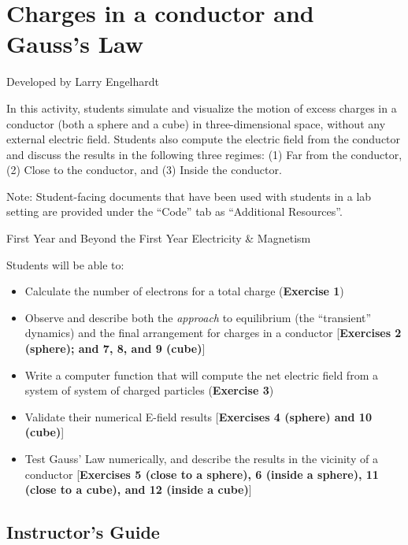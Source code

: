 \documentclass[]{article}
\date{}
\providecommand{\tightlist}{%
  \setlength{\itemsep}{0pt}\setlength{\parskip}{0pt}}
\begin{document}
\section{Charges in a conductor and Gauss's
Law}\label{charges-in-a-conductor-and-gausss-law}

Developed by Larry Engelhardt

In this activity, students simulate and visualize the motion of excess
charges in a conductor (both a sphere and a cube) in three-dimensional
space, without any external electric field. Students also compute the
electric field from the conductor and discuss the results in the
following three regimes: (1) Far from the conductor, (2) Close to the
conductor, and (3) Inside the conductor.

Note: Student-facing documents that have been used with students in a
lab setting are provided under the ``Code'' tab as ``Additional
Resources''.

\begin{description}
\tightlist
\item[Course Context]
First Year and Beyond the First Year Electricity \& Magnetism
\item[Learning Objectives]
Students will be able to:
\end{description}

\begin{itemize}
\tightlist
\item
  Calculate the number of electrons for a total charge (\textbf{Exercise
  1})
\item
  Observe and describe both the \emph{approach} to equilibrium (the
  ``transient'' dynamics) and the final arrangement for charges in a
  conductor {[}\textbf{Exercises 2 (sphere); and 7, 8, and 9 (cube)}{]}
\item
  Write a computer function that will compute the net electric field
  from a system of system of charged particles (\textbf{Exercise 3})
\item
  Validate their numerical E-field results {[}\textbf{Exercises 4
  (sphere) and 10 (cube)}{]}
\item
  Test Gauss' Law numerically, and describe the results in the vicinity
  of a conductor {[}\textbf{Exercises 5 (close to a sphere), 6 (inside a
  sphere), 11 (close to a cube), and 12 (inside a cube)}{]}
\end{itemize}

\subsection{Instructor's Guide}\label{instructors-guide}
\end{document}
